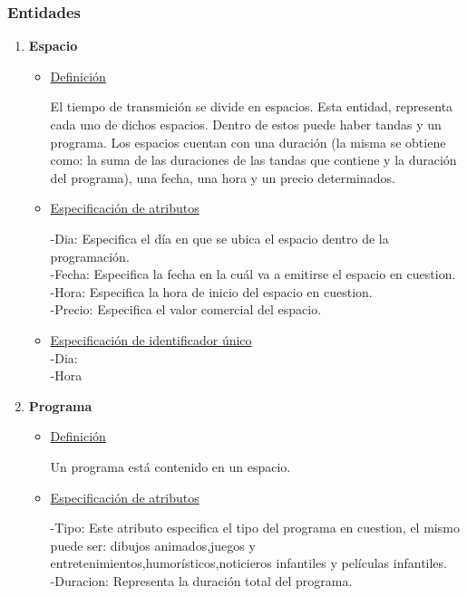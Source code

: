\documentclass[a4paper,10pt,titlepage]{article}
\begin{document}
\subsubsection{Entidades}
\begin{enumerate}

\item {\bf Espacio}

\begin{itemize}
 
\item \underline{Definici\'on}

El tiempo de transmici\'on se divide en espacios. Esta entidad, representa cada uno de dichos espacios.
Dentro de estos puede haber tandas y un programa. Los espacios cuentan con una duraci\'on
(la misma se obtiene como: la suma de las duraciones de las tandas que contiene y la duraci\'on del programa), una fecha, una hora y un precio determinados.

\item \underline{Especificaci\'on de atributos}

-Dia: Especifica el d\'ia en que se ubica el espacio dentro de la programaci\'on.\\
-Fecha: Especifica la fecha en la cu\'al va a emitirse el espacio en cuestion.\\
-Hora: Especifica la hora de inicio del espacio en cuestion.\\
-Precio: Especifica el valor comercial del espacio.\\

\item \underline{Especificaci\'on de identificador \'unico}\\
-Dia: \\
-Hora\\
\end{itemize}

\item {\bf Programa}

\begin{itemize}
 
\item \underline{Definici\'on}

Un programa est\'a contenido en un espacio. 

\item \underline{Especificaci\'on de atributos}

-Tipo: Este atributo especifica el tipo del programa en cuestion, el mismo puede ser: dibujos animados,juegos y entretenimientos,humor\'isticos,noticieros infantiles y pel\'iculas infantiles.\\
-Duracion: Representa la duraci\'on total del programa.


\end{itemize}
\end{enumerate}
\end{document}
